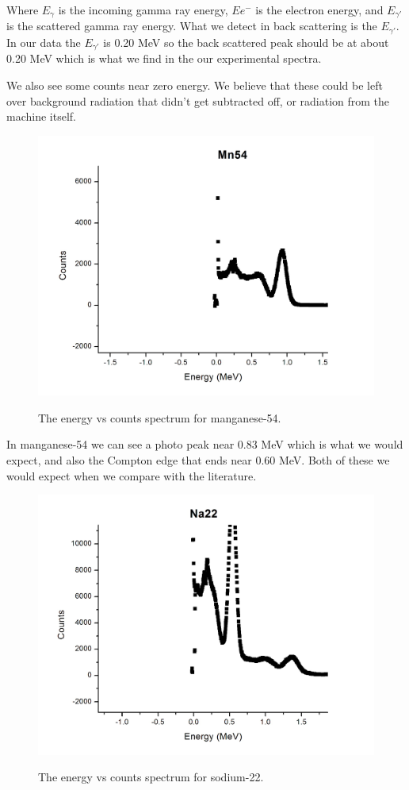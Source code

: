 \documentclass[12pt letterpaper]{article}
\begin{document}
Where $E_{\gamma}$ is the incoming gamma ray energy, $E{e^-}$ is the electron energy, and $E_{\gamma'}$ is the scattered gamma ray energy. What we detect in back scattering is the $E_{\gamma'}$. In our data the $E_{\gamma'}$ is 0.20 MeV so the back scattered peak should be at about 0.20 MeV which is what we find in the our experimental spectra. 

We also see some counts near zero energy. We believe that these could be left over background radiation that didn't get subtracted off, or radiation from the machine itself.  

\begin{figure}[H]
  \caption{The energy vs counts spectrum for manganese-54.}
  \centering
    \includegraphics[width=.60\textwidth]{mn54.JPG}
    \label{fig:mn54}
\end{figure}

In manganese-54 we can see a photo peak near 0.83 MeV which is what we would expect, and also the Compton edge that ends near 0.60 MeV. Both of these we would expect when we compare with the literature. 


\begin{figure}[H]
  \caption{The energy vs counts spectrum for sodium-22.}
  \centering
    \includegraphics[width=.60\textwidth]{na22.JPG}
    \label{fig:na22}
\end{figure}
\end{document}
